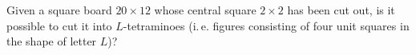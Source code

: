 \problem{}
Given a square board $20 \times 12$ whose central square $2 \times 2$ has been
cut out, is it possible to cut it into $L$-tetraminoes
(i.\,e. figures consisting of four unit squares in the shape of letter $L$)?
\solution
\endproblem
